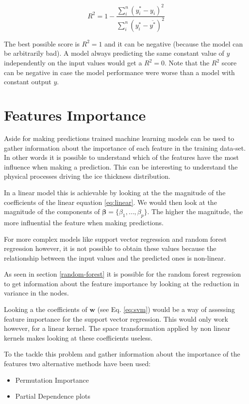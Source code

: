 \begin{equation}\label{eq:score}
R^2 = 1 - \frac{\sum_{i}^{n}(y^*_i-y_i)^2}{\sum_{i}^{n}(y^*_i-\overline{y^*})^2}
\end{equation}

The best possible score is $R^2 = 1$ and it can be negative (because the model can be arbitrarily bad). A model always predicting the same constant value of $y$ independently on the input values would get a $R^2 = 0$. Note that the $R^2$ score can be negative in case the model performance were worse than a model with constant output $y$.

\section{Features Importance}\label{featuresimp}
Aside for making predictions trained machine learning models can be used to gather information about the importance of each feature in the training data-set. In other words it is possible to understand which of the features have the most influence when making a prediction. This can be interesting to understand the physical processes driving the ice thickness distribution.

In a linear model this is achievable by looking at the the magnitude of the coefficients of the linear equation \ref{eq:linear}. We would then look at the magnitude of the components of $ \bm{\beta} = \{\beta_{1},\ldots ,\beta_{p}\}$. The higher the magnitude, the more influential the feature when making predictions.

For more complex models like support vector regression and random forest regression however, it is not possible to obtain these values because the relationship between the input values and the predicted ones is non-linear.

As seen in section \ref{random-forest} it is possible for the random forest regression to get information about the feature importance by looking at the reduction in variance in the nodes.

Looking a the coefficients of $\mathbf{w}$ (see Eq. \ref{eq:svm}) would be a way of assessing feature importance for the support vector regression. This would only work however, for a linear kernel. The space transformation applied by non linear kernels makes looking at these coefficients useless.

To the tackle this problem and gather information about the importance of the features two alternative methods have been used:
\begin{itemize}
	\item Permutation Importance
	\item Partial Dependence plots
\end{itemize} 

